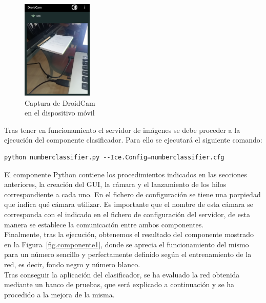 \begin{figure}[H]
	\begin{center}
		\includegraphics[width=0.3\textwidth]{figures/droidcamMov}
		\caption{Captura de DroidCam\\ 
			en el dispositivo móvil}
		\label{fig.droidMov}
	\end{center}
\end{figure}

Tras tener en funcionamiento el servidor de imágenes se debe proceder a la ejecución del componente clasificador. Para ello se ejecutará el siguiente comando:
\vspace{10pt}
\begin{lstlisting}[frame=single]
	python numberclassifier.py --Ice.Config=numberclassifier.cfg
\end{lstlisting}

El componente Python contiene los procedimientos indicados en las secciones anteriores, la creación del GUI, la cámara y el lanzamiento de los hilos correspondiente a cada uno. En el fichero de configuración se tiene una porpiedad que indica qué cámara utilizar. Es importante que el nombre de esta cámara se corresponda con el indicado en el fichero de configuración del servidor, de esta manera se establece la comunicación entre ambos componentes.\\

Finalmente, tras la ejecución, obtenemos el resultado del componente mostrado en la Figura~\ref{fig.componente1}, donde se aprecia el funcionamiento del mismo para un número sencillo y perfectamente definido según el entrenamiento de la red, es decir, fondo negro y número blanco.\\

Tras conseguir la aplicación del clasificador, se ha evaluado la red obtenida mediante un banco de pruebas, que será explicado a continuación y se ha procedido a la mejora de la misma.

